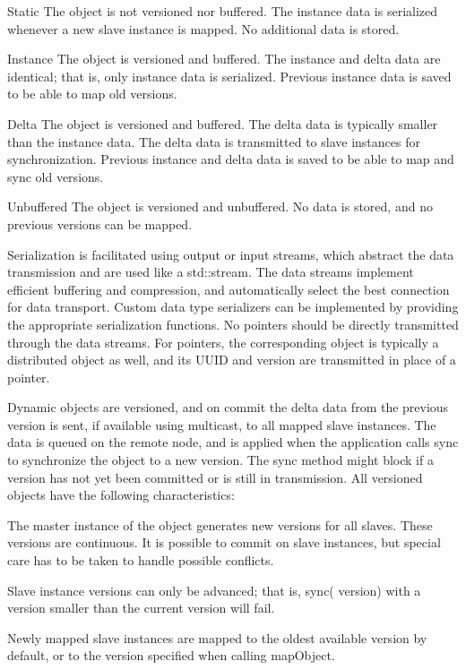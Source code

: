 \documentclass[10pt,journal,compsoc]{IEEEtran}
\begin{document}
\begin{compactdesc}
\item[Static] The object is not versioned nor buffered. The instance data is
  serialized whenever a new slave instance is mapped. No additional data is
  stored.
\item[Instance] The object is versioned and buffered. The instance and delta
  data are identical; that is, only instance data is serialized. Previous
  instance data is saved to be able to map old versions.
\item[Delta] The object is versioned and buffered. The delta data is typically
  smaller than the instance data. The delta data is transmitted to slave
  instances for synchronization. Previous instance and delta data is saved to be
  able to map and sync old versions.
\item[Unbuffered] The object is versioned and unbuffered. No data is stored, and
  no previous versions can be mapped.
\end{compactdesc}

Serialization is facilitated using output or input streams, which abstract the
data transmission and are used like a \textsf{std::stream}. The data streams
implement efficient buffering and compression, and automatically select the best
connection for data transport. Custom data type serializers can be implemented
by providing the appropriate serialization functions. No pointers should be
directly transmitted through the data streams. For pointers, the corresponding
object is typically a distributed object as well, and its UUID and version are
transmitted in place of a pointer.

Dynamic objects are versioned, and on \textsf{commit} the delta data from the
previous version is sent, if available using multicast, to all mapped slave
instances. The data is queued on the remote node, and is applied when the
application calls \textsf{sync} to synchronize the object to a new version. The
\textsf{sync} method might block if a version has not yet been committed or is
still in transmission. All versioned objects have the following characteristics:

\begin{compactitem}
\item The master instance of the object generates new versions for all
  slaves. These versions are continuous. It is possible to commit on slave
  instances, but special care has to be taken to handle possible
  conflicts.
\item Slave instance versions can only be advanced; that is, \textsf{sync(
  version)} with a version smaller than the current version will fail.
\item Newly mapped slave instances are mapped to the oldest available
  version by default, or to the version specified when calling
  \textsf{mapObject}.
\end{compactitem}
\end{document}

